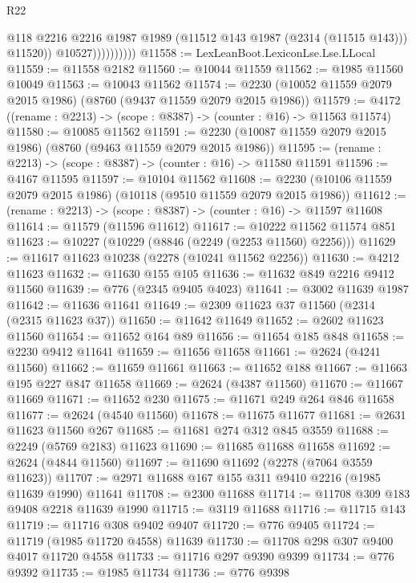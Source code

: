 \begin{lexlean}{R22}
\begin{coremodule}
                            @118
                            @2216
                            @2216
                            @1987
                            @1989
                            (@11512 @143 @1987 (@2314 (@11515 @143)))
                            @11520))
                        @10527))))))))))
@11558 := LexLeanBoot.LexiconLse.Lse.LLocal
@11559 := @11558 @2182
@11560 := @10044 @11559
@11562 := @1985 @11560 @10049
@11563 := @10043 @11562
@11574 := @2230 (@10052 @11559 @2079 @2015 @1986) (@8760 (@9437 @11559 @2079 @2015 @1986))
@11579 := @4172 ((rename : @2213) -> (scope : @8387) -> (counter : @16) -> @11563 @11574)
@11580 := @10085 @11562
@11591 := @2230 (@10087 @11559 @2079 @2015 @1986) (@8760 (@9463 @11559 @2079 @2015 @1986))
@11595 := (rename : @2213) -> (scope : @8387) -> (counter : @16) -> @11580 @11591
@11596 := @4167 @11595
@11597 := @10104 @11562
@11608 := @2230 (@10106 @11559 @2079 @2015 @1986) (@10118 (@9510 @11559 @2079 @2015 @1986))
@11612 := (rename : @2213) -> (scope : @8387) -> (counter : @16) -> @11597 @11608
@11614 := @11579 (@11596 @11612)
@11617 := @10222 @11562 @11574 @851
@11623 := @10227 (@10229 (@8846 (@2249 (@2253 @11560) @2256)))
@11629 := @11617 @11623 @10238 (@2278 (@10241 @11562 @2256))
@11630 := @4212 @11623
@11632 := @11630 @155 @105
@11636 := @11632 @849 @2216 @9412 @11560
@11639 := @776 (@2345 @9405 @4023)
@11641 := @3002 @11639 @1987
@11642 := @11636 @11641
@11649 := @2309 @11623 @37 @11560 (@2314 (@2315 @11623 @37))
@11650 := @11642 @11649
@11652 := @2602 @11623 @11560
@11654 := @11652 @164 @89
@11656 := @11654 @185 @848
@11658 := @2230 @9412 @11641
@11659 := @11656 @11658
@11661 := @2624 (@4241 @11560)
@11662 := @11659 @11661
@11663 := @11652 @188
@11667 := @11663 @195 @227 @847 @11658
@11669 := @2624 (@4387 @11560)
@11670 := @11667 @11669
@11671 := @11652 @230
@11675 := @11671 @249 @264 @846 @11658
@11677 := @2624 (@4540 @11560)
@11678 := @11675 @11677
@11681 := @2631 @11623 @11560 @267
@11685 := @11681 @274 @312 @845 @3559
@11688 := @2249 (@5769 @2183) @11623
@11690 := @11685 @11688 @11658
@11692 := @2624 (@4844 @11560)
@11697 := @11690 @11692 (@2278 (@7064 @3559 @11623))
@11707 := @2971 @11688 @167 @155 @311 @9410 @2216 (@1985 @11639 @1990) @11641
@11708 := @2300 @11688
@11714 := @11708 @309 @183 @9408 @2218 @11639 @1990
@11715 := @3119 @11688
@11716 := @11715 @143
@11719 := @11716 @308 @9402 @9407
@11720 := @776 @9405
@11724 := @11719 (@1985 @11720 @4558) @11639
@11730 := @11708 @298 @307 @9400 @4017 @11720 @4558
@11733 := @11716 @297 @9390 @9399
@11734 := @776 @9392
@11735 := @1985 @11734
@11736 := @776 @9398

\end{coremodule}
\end{lexlean}
